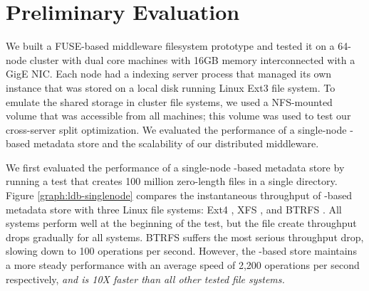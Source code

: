 \section{Preliminary Evaluation}

We built a FUSE-based middleware filesystem prototype and tested it on a
64-node cluster with dual core machines with 16GB memory interconnected with a 
GigE NIC.
Each node had a \giga{} indexing server process that managed its own \ldb instance 
that was stored on a local disk running Linux Ext3 file system.
To emulate the shared storage in cluster file systems, we used a NFS-mounted
volume that was accessible from all machines; this volume was used to 
test our cross-server \ldb split optimization.
We evaluated the performance of a single-node \ldb-based metadata store and
the scalability of our distributed middleware.

We first evaluated the performance of a single-node \ldb-based metadata store
by running a test that creates 100 million zero-length files in a single
directory.
Figure \ref{graph:ldb-singlenode} compares the instantaneous throughput of \ldb-based metadata 
store with three Linux file systems: Ext4 \citep{Ext4}, XFS \citep{XFS}, and
BTRFS \citep{BTRFS}.
All systems perform well at the beginning of the test, but the file create
throughput drops gradually for all systems. 
BTRFS suffers the most serious throughput drop, slowing down to 100 operations 
per second. However, the \ldb-based store maintains a more steady performance 
with an average speed of 2,200 operations per second respectively,
\textit{and is 10X faster than all other tested file systems.}

